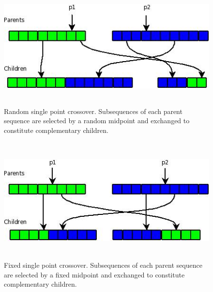 \documentclass[12pt]{article}
\begin{document}
\begin{figure}[htb]
\begin{center}
\includegraphics[height=2.5in,width=4.5in]{images/single_point_crossover.jpeg}
\caption{Random single point crossover.
    Subsequences of each parent sequence are selected by a random midpoint and exchanged to constitute complementary children.}
\end{center}
\end{figure}

\begin{figure}[htb]
\begin{center}
\includegraphics[height=2.5in,width=4.5in]{images/fixed_point_crossover.jpeg}
\caption{Fixed single point crossover.  Subsequences of each parent sequence are selected by a fixed midpoint and exchanged to constitute complementary children.}
\end{center}
\end{figure}
\end{document}
